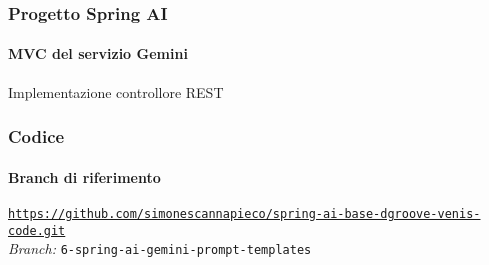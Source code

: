 %
\begin{frame}[t,fragile] \frametitle{Progetto Spring AI}
    \framesubtitle{MVC del servizio Gemini}
    	\vspace*{-.7cm}
        \begin{block}{Implementazione controllore REST}
			{\tiny}
    	\end{block}
\end{frame}
%
\begin{frame}[fragile] \frametitle{Codice}
    \framesubtitle{Branch di riferimento}
	\begin{center}
		{\scriptsize \href{https://github.com/simonescannapieco/spring-ai-base-dgroove-venis-code.git}{\texttt{https://github.com/simonescannapieco/spring-ai-base-dgroove-venis-code.git}}}\\
		\textit{Branch:} \alert{\texttt{6-spring-ai-gemini-prompt-templates}}
	\end{center}
\end{frame}